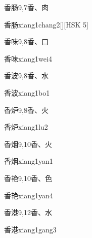 \begin{entry}{香肠}{9,7}{⾹、⾁}
  \begin{phonetics}{香肠}{xiang1chang2}[][HSK 5]
  \end{phonetics}
\end{entry}

\begin{entry}{香味}{9,8}{⾹、⼝}
  \begin{phonetics}{香味}{xiang1wei4}
  \end{phonetics}
\end{entry}

\begin{entry}{香波}{9,8}{⾹、⽔}
  \begin{phonetics}{香波}{xiang1bo1}
  \end{phonetics}
\end{entry}

\begin{entry}{香炉}{9,8}{⾹、⽕}
  \begin{phonetics}{香炉}{xiang1lu2}
  \end{phonetics}
\end{entry}

\begin{entry}{香烟}{9,10}{⾹、⽕}
  \begin{phonetics}{香烟}{xiang1yan1}
  \end{phonetics}
\end{entry}

\begin{entry}{香艳}{9,10}{⾹、⾊}
  \begin{phonetics}{香艳}{xiang1yan4}
  \end{phonetics}
\end{entry}

\begin{entry}{香港}{9,12}{⾹、⽔}
  \begin{phonetics}{香港}{xiang1gang3}
  \end{phonetics}
\end{entry}

